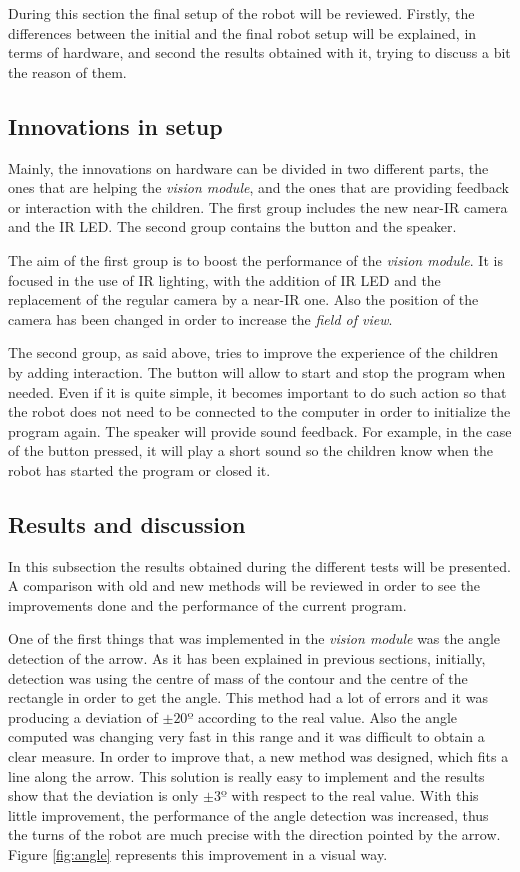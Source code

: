 During this section the final setup of the robot will be reviewed. Firstly, the differences between the initial and the final robot setup will be explained, in terms of hardware, and second the results obtained with it, trying to discuss a bit the reason of them.

\subsection{Innovations in setup}

Mainly, the innovations on hardware can be divided in two different parts, the ones that are helping the \textit{vision module}, and the ones that are providing feedback or interaction with the children. The first group includes the new near-IR camera and the IR LED. The second group contains the button and the speaker.

The aim of the first group is to boost the performance of the \textit{vision module}. It is focused in the use of IR lighting, with the addition of IR LED and the replacement of the regular camera by a near-IR one. Also the position of the camera has been changed in order to increase the \textit{field of view}.

The second group, as said above, tries to improve the experience of the children by adding interaction. The button will allow to start and stop the program when needed. Even if it is quite simple, it becomes important to do such action so that the robot does not need to be connected to the computer in order to initialize the program again. The speaker will provide sound feedback. For example, in the case of the button pressed, it will play a short sound so the children know when the robot has started the program or closed it.


\subsection{Results and discussion}

In this subsection the results obtained during the different tests will be presented. A comparison with old and new methods will be reviewed in order to see the improvements done and the performance of the current program. 

One of the first things that was implemented in the \textit{vision module} was the angle detection of the arrow. As it has been explained in previous sections, initially, detection was using the centre of mass of the contour and the centre of the rectangle in order to get the angle. This method had a lot of errors and it was producing a deviation of $\pm 20º$ according to the real value. Also the angle computed was changing very fast in this range and it was difficult to obtain a clear measure. In order to improve that, a new method was designed, which fits a line along the arrow. This solution is really easy to implement and the results show that the deviation is only $\pm 3º$ with respect to the real value. With this little improvement, the performance of the angle detection was increased, thus the turns of the robot are much precise with the direction pointed by the arrow. Figure \ref{fig:angle} represents this improvement in a visual way.

